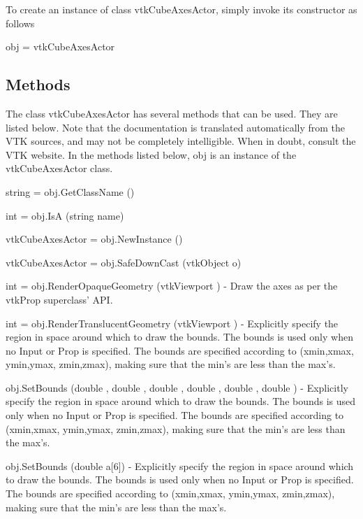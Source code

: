 To create an instance of class vtk\-Cube\-Axes\-Actor, simply invoke its constructor as follows \begin{DoxyVerb}  obj = vtkCubeAxesActor
\end{DoxyVerb}
 \hypertarget{vtkwidgets_vtkxyplotwidget_Methods}{}\subsection{Methods}\label{vtkwidgets_vtkxyplotwidget_Methods}
The class vtk\-Cube\-Axes\-Actor has several methods that can be used. They are listed below. Note that the documentation is translated automatically from the V\-T\-K sources, and may not be completely intelligible. When in doubt, consult the V\-T\-K website. In the methods listed below, {\ttfamily obj} is an instance of the vtk\-Cube\-Axes\-Actor class. 
\begin{DoxyItemize}
\item {\ttfamily string = obj.\-Get\-Class\-Name ()}  
\item {\ttfamily int = obj.\-Is\-A (string name)}  
\item {\ttfamily vtk\-Cube\-Axes\-Actor = obj.\-New\-Instance ()}  
\item {\ttfamily vtk\-Cube\-Axes\-Actor = obj.\-Safe\-Down\-Cast (vtk\-Object o)}  
\item {\ttfamily int = obj.\-Render\-Opaque\-Geometry (vtk\-Viewport )} -\/ Draw the axes as per the vtk\-Prop superclass' A\-P\-I.  
\item {\ttfamily int = obj.\-Render\-Translucent\-Geometry (vtk\-Viewport )} -\/ Explicitly specify the region in space around which to draw the bounds. The bounds is used only when no Input or Prop is specified. The bounds are specified according to (xmin,xmax, ymin,ymax, zmin,zmax), making sure that the min's are less than the max's.  
\item {\ttfamily obj.\-Set\-Bounds (double , double , double , double , double , double )} -\/ Explicitly specify the region in space around which to draw the bounds. The bounds is used only when no Input or Prop is specified. The bounds are specified according to (xmin,xmax, ymin,ymax, zmin,zmax), making sure that the min's are less than the max's.  
\item {\ttfamily obj.\-Set\-Bounds (double a\mbox{[}6\mbox{]})} -\/ Explicitly specify the region in space around which to draw the bounds. The bounds is used only when no Input or Prop is specified. The bounds are specified according to (xmin,xmax, ymin,ymax, zmin,zmax), making sure that the min's are less than the max's.  

\end{DoxyItemize}
